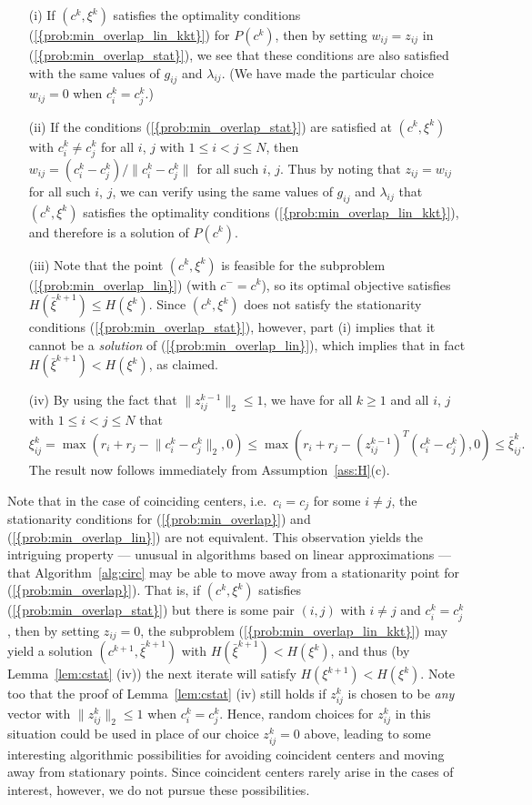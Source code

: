 \documentclass{siamltex}
\providecommand{\norm}[1]{\lVert#1\rVert}
\begin{document}
\begin{itemize}
\item[(i)] If $(c^k,\xi^k)$ satisfies the optimality conditions
  {(\ref{{prob:min_overlap_lin_kkt}})} for $P(c^k)$, then by setting
  $w_{ij}=z_{ij}$ in {(\ref{{prob:min_overlap_stat}})}, we see that these
  conditions are also satisfied with the same values of $g_{ij}$ and
  $\lambda_{ij}$. (We have made the particular choice $w_{ij}=0$ when
  $c_i^k=c_j^k$.) 
\item[(ii)] If the conditions
{(\ref{{prob:min_overlap_stat}})} are satisfied at
  $(c^k,\xi^k)$ with $c_i^k \neq c_j^k$ for all $i$, $j$ with $1\le i
  < j \le N$, then $w_{ij} = (c_i^k-c_j^k)/\norm{c_i^k-c_j^k}$ for all
  such $i$, $j$. Thus by noting that $z_{ij}=w_{ij}$ for all such $i$,
  $j$, we can verify using the same values of $g_{ij}$ and
  $\lambda_{ij}$ that $(c^k,\xi^k)$ satisfies the optimality
  conditions {(\ref{{prob:min_overlap_lin_kkt}})}, and therefore is a solution
  of $P(c^k)$.
\item[(iii)] Note that the point $(c^k,\xi^k)$ is feasible for the
  subproblem {(\ref{{prob:min_overlap_lin}})} (with $c^-=c^k$), so its
  optimal objective satisfies $H(\bar{\xi}^{k+1}) \le H(\xi^k)$. Since
  $(c^k,\xi^k)$ does not satisfy the stationarity conditions
  {(\ref{{prob:min_overlap_stat}})}, however, part (i) implies that it
  cannot be a {\em solution} of {(\ref{{prob:min_overlap_lin}})}, which
  implies that in fact $H(\bar{\xi}^{k+1}) < H(\xi^k)$, as claimed.
\item[(iv)] By using the fact that $\norm{z_{ij}^{k-1}}_2 \le 1$, we have for
  all $k \ge 1$ and all $i$, $j$ with $1 \le i < j \le N$ that
\[
\xi_{ij}^k = \max(r_i+r_j-\norm{c_i^k-c_j^k}_2,0)
\le \max(r_i+r_j - (z_{ij}^{k-1})^T(c_i^k-c_j^k),0) 
\le \bar{\xi}_{ij}^k.
\]
The result now follows immediately from Assumption~\ref{ass:H}(c). \endproof
\end{itemize}

Note that in the case of coinciding centers, i.e.~$c_i=c_j$ for some
$i \neq j$, the stationarity conditions for {(\ref{{prob:min_overlap}})}
and {(\ref{{prob:min_overlap_lin}})} are not equivalent. This observation
yields the intriguing property --- unusual in algorithms based on
linear approximations --- that Algorithm~\ref{alg:circ} may be able to
move away from a stationarity point for {(\ref{{prob:min_overlap}})}. That
is, if $(c^k,\xi^k)$ satisfies {(\ref{{prob:min_overlap_stat}})} but there
is some pair $(i,j)$ with $i \neq j$ and $c_i^k=c_j^k$, then by
setting $z_{ij}=0$, the subproblem {(\ref{{prob:min_overlap_lin_kkt}})}
may yield a solution $(c^{k+1},\bar{\xi}^{k+1})$ with
$H(\bar{\xi}^{k+1}) < H(\xi^k)$, and thus (by Lemma~\ref{lem:cstat}
(iv)) the next iterate will satisfy $H(\xi^{k+1}) < H(\xi^k)$.  Note
too that the proof of Lemma~\ref{lem:cstat} (iv) still holds if
$z_{ij}^k$ is chosen to be {\em any} vector with $\norm{z_{ij}^k}_2
\le 1$ when $c_i^k=c_j^k$. Hence, random choices for $z_{ij}^k$ in
this situation could be used in place of our choice $z_{ij}^k=0$
above, leading to some interesting algorithmic possibilities for
avoiding coincident centers and moving away from stationary points.
Since coincident centers rarely arise in the cases of interest,
however, we do not pursue these possibilities.
\end{document}

